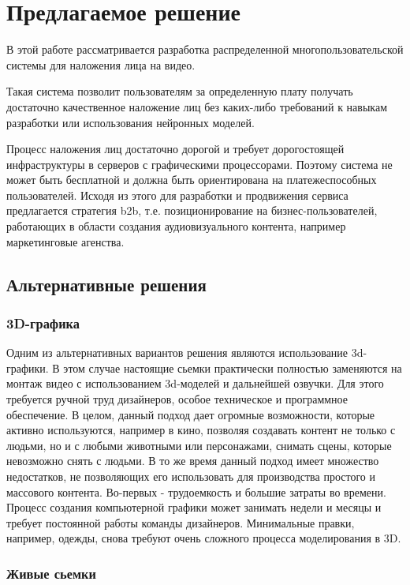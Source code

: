 \section{Предлагаемое решение}

В этой работе рассматривается разработка распределенной многопользовательской системы для наложения лица на видео.

Такая система позволит пользователям за определенную плату получать достаточно качественное наложение лиц без каких-либо требований к навыкам разработки или использования нейронных моделей. 

Процесс наложения лиц достаточно дорогой и требует дорогостоящей инфраструктуры в серверов с графическими процессорами. Поэтому система не может быть бесплатной и должна быть ориентирована на платежеспособных пользователей. Исходя из этого для разработки и продвижения сервиса предлагается стратегия b2b, т.е. позиционирование на бизнес-пользователей, работающих в области создания аудиовизуального контента, например маркетинговые агенства.

\subsection{Альтернативные решения}

\subsubsection*{3D-графика}

Одним из альтернативных вариантов решения являются использование 3d-графики. В этом случае настоящие сьемки практически полностью заменяются на монтаж видео с использованием 3d-моделей и дальнейшей озвучки.
Для этого требуется ручной труд дизайнеров, особое техническое и программное обеспечение.
В целом, данный подход дает огромные возможности, которые активно используются, например в кино, позволяя создавать контент не только с людьми, но и с любыми животными или персонажами, снимать сцены, которые невозможно снять с людьми.
В то же время данный подход имеет множество недостатков, не позволяющих его использовать для производства простого и массового контента. Во-первых - трудоемкость и большие затраты во времени. Процесс создания компьютерной графики может занимать недели и месяцы и требует постоянной работы команды дизайнеров. Минимальные правки, например, одежды, снова требуют очень сложного процесса моделирования в 3D.

\subsubsection*{Живые сьемки}

